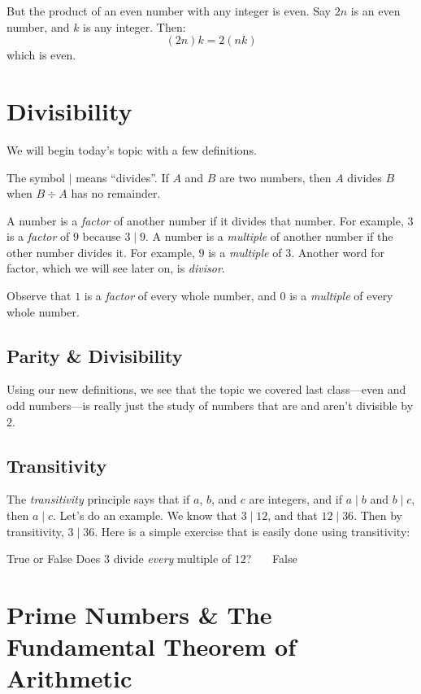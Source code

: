 \documentclass[a4paper,10pt]{report}
\begin{document}
But the product of an even number with any integer is even. Say $2n$ is an
even number, and $k$ is any integer. Then: \[
 (2n)k = 2(nk)
\] which is even.

\chapter{Divisibility}

We will begin today's topic with a few definitions.

The symbol $\mid$ means ``divides''. If $A$ and $B$ are two numbers, then $A$
divides $B$ when $B \div A$ has no remainder.

A number is a \emph{factor} of another number if it divides that number. For
example, $3$ is a \emph{factor} of $9$ because $3 \mid 9$. A number is a
\emph{multiple} of another number if the other number divides it. For example,
$9$ is a \emph{multiple} of $3$. Another word for factor, which we will see
later on, is \emph{divisor}.

Observe that $1$ is a \emph{factor} of every whole number, and $0$ is a
\emph{multiple} of every whole number.

\section{Parity \& Divisibility}

Using our new definitions, we see that the topic we covered last class---even
and odd numbers---is really just the study of numbers that are and aren't
divisible by $2$.

\section{Transitivity}

The \emph{transitivity} principle says that if $a$, $b$, and $c$ are integers,
and if $a \mid b$ and $b \mid c$, then $a \mid c$. Let's do an example. We know
that $3 \mid 12$, and that $12 \mid 36$. Then by transitivity, $3 \mid 36$. Here
is a simple exercise that is easily done using transitivity:

\begin{problem}{True or False}
 Does $3$ divide \emph{every} multiple of $12$? \hfill {}~~~False
\end{problem}

\chapter{Prime Numbers \& The Fundamental Theorem of Arithmetic}
\end{document}
